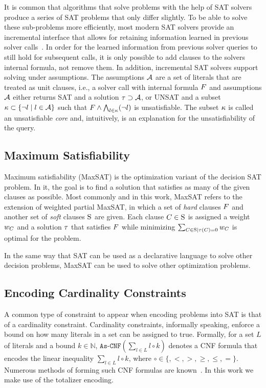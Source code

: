 It is common that algorithms that solve problems with the help of SAT solvers produce a series of SAT problems that only differ slightly.
To be able to solve these sub-problems more efficiently, most modern SAT solvers provide an incremental interface that allows for retaining information learned in previous solver calls~\autocite{DBLP:journals/entcs/EenS03,handbook2-cdcl}.
In order for the learned information from previous solver queries to still hold for subsequent calls, it is only possible to add clauses to the solvers internal formula, not remove them.
In addition, incremental SAT solvers support solving under assumptions.
The assumptions $\mathcal{A}$ are a set of literals that are treated as unit clauses, i.e., a solver call with internal formula $F$ and assumptions $\mathcal{A}$ either returns SAT and a solution $\tau \supset \mathcal{A}$, or UNSAT and a subset $\kappa \subset \{\lnot l \mid l\in\mathcal{A}\}$ such that $F \land \bigwedge_{l \in \kappa} (\lnot l)$ is unsatisfiable.
The subset $\kappa$ is called an unsatisfiable \emph{core} and, intuitively, is an explanation for the unsatisfiability of the query.

\subsection{Maximum Satisfiability\label{sec:max-sat}}

Maximum satisfiability (MaxSAT) is the optimization variant of the decision SAT problem.
In it, the goal is to find a solution that satisfies as many of the given clauses as possible.
Most commonly and in this work, MaxSAT refers to the extension of weighted partial MaxSAT, in which a set of \emph{hard} clauses $F$ and another set of \emph{soft} clauses $\textsc{S}$ are given.
Each clause $C \in \textsc{S}$ is assigned a weight $w_C$ and a solution $\tau$ that satisfies $F$ while minimizing $\sum_{C\in\textsc{S} \mid \tau(C)=0} w_C$ is optimal for the problem.

In the same way that SAT can be used as a declarative language to solve other decision problems, MaxSAT can be used to solve other optimization problems.

\subsection{Encoding Cardinality Constraints\label{sec:card-const}}

A common type of constraint to appear when encoding problems into SAT is that of a cardinality constraint.
Cardinality constraints, informally speaking, enforce a bound on how many literals in a set can be assigned to true.
Formally, for a set $L$ of literals and a bound $k \in \mathbb{N}$, $\texttt{As-CNF}\left(\sum_{l \in L} l \circ k\right)$ denotes a CNF formula that encodes the linear inequality $\sum_{l \in L} l \circ k$, where $\circ \in \{ ,< ,> ,\geq, \leq, =\}$.
Numerous methods of forming such CNF formulas are known~\autocite{DBLP:conf/cp/BailleuxB03}.
In this work we make use of the totalizer encoding.

